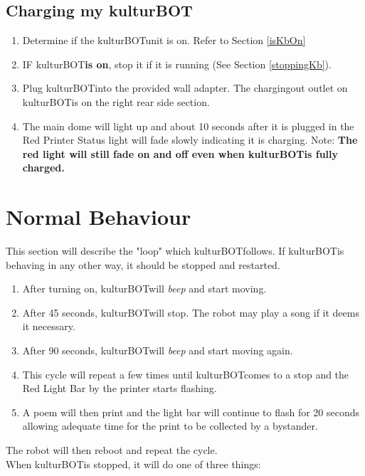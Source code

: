 \documentclass[]{article}
\newcommand{\kb}{kulturBOT}
\newcommand{\kbspace}{\kb \space}
\newcommand{\mykb}{my \kb}
\begin{document}
\subsection{Charging \mykb}
\label{chargingKB}

\begin{enumerate}
\item Determine if the \kbspace unit is on. Refer to Section \ref{isKbOn}
\item IF \kbspace \textbf{is on}, stop it if it is running (See Section \ref{stoppingKb}).
\item Plug \kbspace into the provided wall adapter. The chargingout outlet on \kbspace is on the right rear side section.
\item The main dome will light up and about 10 seconds after it is plugged in the Red Printer Status light will fade slowly indicating it is charging. Note: \textbf{The red light will still fade on and off even when \kbspace is fully charged.}
\end{enumerate}

\section{Normal Behaviour}

This section will describe the "loop" which \kbspace follows. If \kbspace is behaving in any other way, it should be stopped and restarted.

\begin{enumerate}
\item After turning on, \kbspace will \textit{beep} and start moving.
\item After 45 seconds, \kbspace will stop. The robot may play a song if it deems it necessary.
\item After 90 seconds, \kbspace will \textit{beep} and start moving again.
\item This cycle will repeat a few times until \kbspace comes to a stop and the Red Light Bar by the printer starts flashing.
\item A poem will then print and the light bar will continue to flash for 20 seconds allowing adequate time for the print to be collected by a bystander.
\end{enumerate}

The robot will then reboot and repeat the cycle.
\\

When \kbspace is stopped, it will do one of three things:
\end{document}
